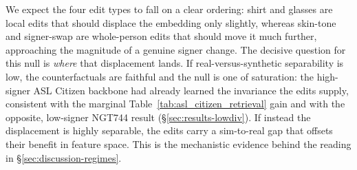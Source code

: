 We expect the four edit types to fall on a clear ordering: shirt and glasses
are local edits that should displace the embedding only slightly, whereas
skin-tone and signer-swap are whole-person edits that should move it much
further, approaching the magnitude of a genuine signer change. The decisive
question for this null is \emph{where} that displacement lands. If
real-versus-synthetic separability is low, the counterfactuals are faithful and the null is one of
saturation: the high-signer ASL Citizen backbone had already learned the
invariance the edits supply, consistent with the marginal
Table~\ref{tab:asl_citizen_retrieval} gain and with the opposite,
low-signer NGT744 result (\S\ref{sec:results-lowdiv}). If instead the
displacement is highly separable, the edits
carry a sim-to-real gap that offsets their benefit in feature space. This is
the mechanistic evidence behind the reading in
\S\ref{sec:discussion-regimes}.
